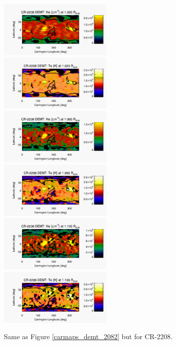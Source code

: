\documentclass[namedreferences]{solarphysics}
\begin{document}
\begin{article}
\begin{figure}[h!]
\begin{center}
\includegraphics[width=0.495\textwidth]{figs/map_Ne_CR2208_DEMT-AIA_H1_L522_r3d_1025_Rsun.pdf}
\includegraphics[width=0.495\textwidth]{figs/map_Tm_CR2208_DEMT-AIA_H1_L522_r3d_1025_Rsun.pdf}
\includegraphics[width=0.495\textwidth]{figs/map_Ne_CR2208_DEMT-AIA_H1_L522_r3d_1065_Rsun.pdf}
\includegraphics[width=0.495\textwidth]{figs/map_Tm_CR2208_DEMT-AIA_H1_L522_r3d_1065_Rsun.pdf}
\includegraphics[width=0.495\textwidth]{figs/map_Ne_CR2208_DEMT-AIA_H1_L522_r3d_1105_Rsun.pdf}
\includegraphics[width=0.495\textwidth]{figs/map_Tm_CR2208_DEMT-AIA_H1_L522_r3d_1105_Rsun.pdf}
\caption{Same as Figure \ref{carmaps_demt_2082} but for CR-2208.}
\label{carmaps_demt_2208}
\end{center}
\end{figure}


\end{article}
\end{document}
